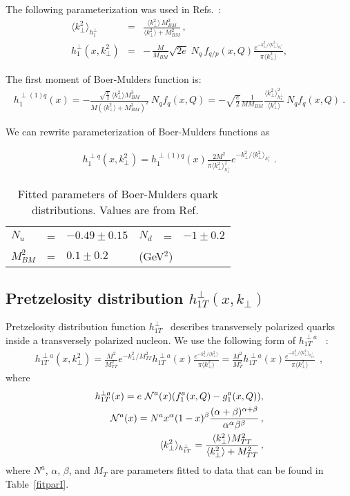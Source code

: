 \documentclass[a4paper,11pt]{article}
\newcommand{\ba}{\begin{eqnarray}}
\newcommand{\ea}{\end{eqnarray}}
\newcommand{\la}{\langle}
\newcommand{\ra}{\rangle}
\def\kperp{k_\perp}
\def\avkperp{\la \kperp^2 \ra}
\begin{document}
The following parameterization was used in Refs.~\cite{Barone:2015ksa}:
\ba
\avkperp_{h_1^\perp} &=& \frac{\avkperp \, M^2_{BM}}{\avkperp + M^2_{BM}} \, , \\
h_{1}^{\perp}(x, \kperp^2) &= &
- \,\frac{M}{M_{BM}}  
\sqrt{2e}\; N_q 
\, f_{q/p} (x, Q)\frac{e^{-\kperp^2/\avkperp_{h_{1}^{\perp}}}}{\pi\avkperp},  
\label{BM-dist}
\ea
 
The first moment of Boer-Mulders function is:
\ba
h_{1}^{\perp (1) q}(x)  = -\frac{\sqrt{\frac{e}{2}} \ \avkperp M_{BM}^3}{M (\avkperp + M_{BM}^2)^2}  \ {N}_q f_q(x, Q) = -\sqrt{\frac{e}{2}} \frac{1}{M M_{BM}}  \frac{\avkperp_{h_1^\perp}^2}{\avkperp}    \ {N}_q  f_q(x, Q)
\label{bm} \ .
\ea
 
We can rewrite parameterization of Boer-Mulders functions as

\ba
h_{1}^{\perp q}(x,\kperp^2) =  h_{1}^{\perp (1) q}(x)   \frac{2 M^2}{\pi \avkperp_{h_{1}^\perp}^2} e^{-\kperp^2/{\avkperp_{h_{1}^\perp}}}\label{bm_new} \ .
\ea
 
 
%
\begin{table}[htb]
\centering
\begin{tabular}{l c l l c l}
\hline
 $N_{u}$ &=& $-0.49 \pm 0.15$ & $N_{d}$ &=& $-1 \pm 0.2$\\
 $M_{BM}^2$ &=& $0.1 \pm  0.2$&\multicolumn{3}{l}{(GeV$^2$)}\\ 
\hline
\end{tabular}
\caption{Fitted parameters of Boer-Mulders quark distributions. Values are from Ref.~\cite{Barone:2015ksa}}
\label{fitparbm}
\end{table}
 
\subsection{\boldmath Pretzelosity distribution $h_{1T}^{\perp}(x,k_\perp)$}
\label{App:basis-h1Tperp}

Pretzelosity   distribution function   
$h_{1T}^{\perp}$~\cite{Lefky:2014eia} describes transversely polarized quarks 
inside a transversely polarized nucleon.
We use the following form of $h_{1T}^{\perp a}$ ~\cite{Lefky:2014eia}:
\ba
h_{1T}^{\perp a}(x,k_{\perp}^2) = \frac{M^2}{M_{TT}^2} e^{-\kperp^2/M_{TT}^2} h^{\perp a}_{1T}(x) \frac{e^{-{\kperp^2}/{\avkperp}}}{\pi \avkperp}=\frac{M^2}{M_T^2} h^{\perp a}_{1T}(x) \frac{e^{-{\kperp^2}/{\avkperp_{h_{1T}^\perp}}}}{\pi \avkperp}\,\;,
\label{eq:h1Tperp}
\ea
where
\ba
h^{\perp a}_{1T}(x) = e  \ {\cal N}^a(x) (f_{1}^{a}(x, Q) - g_{1}^{a}(x, Q)), \label{eq:hx_par}\\
{\cal N}^a(x) = N^{a} x^{\alpha} (1-x)^{\beta} \frac{(\alpha + \beta)^{\alpha + \beta}}{\alpha^{\alpha} \beta^{\beta}}\, ,  \\
\avkperp_{h_{1T}^\perp}  = \frac{\avkperp M_{TT}^2}{\avkperp + M_{TT}^2}\, ,
\ea
where ${N}^a$, $\alpha$, $\beta$, and $M_T$ are parameters fitted to data that can be found in Table~\ref{fitparI}.
\end{document}
